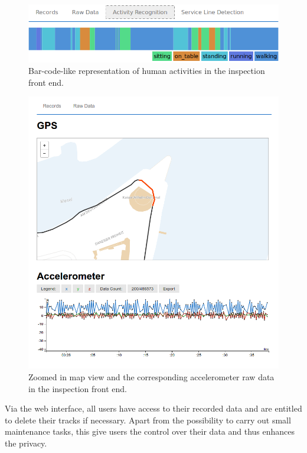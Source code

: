 \documentclass[times, 10pt,twocolumn]{article}
\begin{document}
\begin{figure}[h]
\includegraphics[width=\linewidth]{img/BarcodeScreenshot.png}
\caption{Bar-code-like representation of human activities in the inspection front end.}
\label{fig:inspectionBarcode}
\end{figure}
\begin{figure}[h]
\includegraphics[width=\linewidth]{img/InspectionTool_RAW.png}
\caption{Zoomed in map view and the corresponding accelerometer raw data in the inspection front end.}
\label{fig:inspectionRawData}
\end{figure}

Via the web interface, all users have access to their recorded data and are entitled to delete their tracks if necessary.
Apart from the possibility to carry out small maintenance tasks, this give users the control over their data and thus enhances the privacy.
\end{document}
